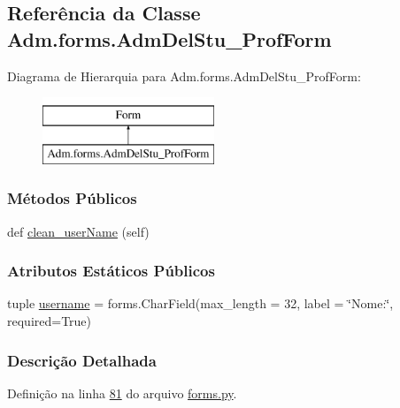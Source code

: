 \hypertarget{classAdm_1_1forms_1_1AdmDelStu__ProfForm}{}\subsection{Referência da Classe Adm.\+forms.\+Adm\+Del\+Stu\+\_\+\+Prof\+Form}
\label{classAdm_1_1forms_1_1AdmDelStu__ProfForm}
Diagrama de Hierarquia para Adm.\+forms.\+Adm\+Del\+Stu\+\_\+\+Prof\+Form\+:\begin{figure}[H]
\begin{center}
\leavevmode
\includegraphics[height=2.000000cm]{d1/d26/classAdm_1_1forms_1_1AdmDelStu__ProfForm}
\end{center}
\end{figure}
\subsubsection*{Métodos Públicos}
\begin{DoxyCompactItemize}
\item 
def \hyperlink{classAdm_1_1forms_1_1AdmDelStu__ProfForm_a94e95abce2216b75e0ddb9ddfdfef5c9}{clean\+\_\+user\+Name} (self)
\end{DoxyCompactItemize}
\subsubsection*{Atributos Estáticos Públicos}
\begin{DoxyCompactItemize}
\item 
tuple \hyperlink{classAdm_1_1forms_1_1AdmDelStu__ProfForm_a780eaf9b2d36cd160f6e574fe9023452}{username} = forms.\+Char\+Field(max\+\_\+length = 32, label = \char`\"{}Nome\+:\char`\"{}, required=True)
\end{DoxyCompactItemize}


\subsubsection{Descrição Detalhada}


Definição na linha \hyperlink{Adm_2forms_8py_source_l00081}{81} do arquivo \hyperlink{Adm_2forms_8py_source}{forms.\+py}.



